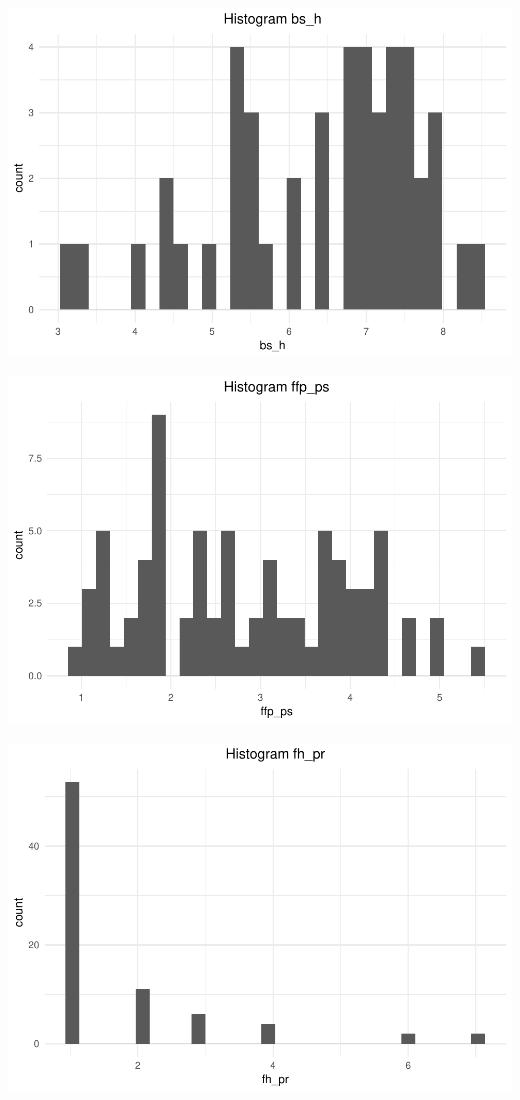 \documentclass[]{elsarticle} %
\makeatletter
\def\maxwidth{\ifdim\Gin@nat@width>\linewidth\linewidth
\else\Gin@nat@width\fi}
\let\Oldincludegraphics\includegraphics
\renewcommand{\includegraphics}[1]{\Oldincludegraphics[width=\maxwidth]{#1}}
\makeatother
\begin{document}
\includegraphics{refugees-stephanie_files/figure-latex/ggplot_variables2-1.pdf}

\includegraphics{refugees-stephanie_files/figure-latex/ggplot_variables3-1.pdf}

\includegraphics{refugees-stephanie_files/figure-latex/ggplot_variables4-1.pdf}
\end{document}
